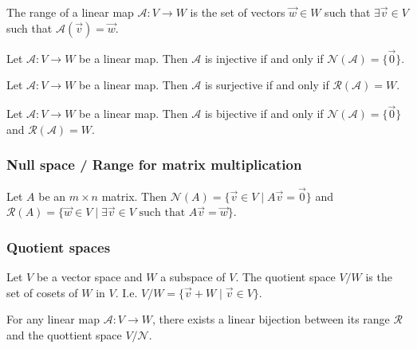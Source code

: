 \begin{definition}[Range]
    The range of a linear map $\mathcal{A}: V \to W$ is the set of vectors $\vec{w} \in W$ such that $\exists \vec{v} \in V$ such that $\mathcal{A}(\vec{v}) = \vec{w}$.
\end{definition}

\begin{theorem}
    Let $\mathcal{A}: V \to W$ be a linear map. Then $\mathcal{A}$ is injective if and only if $\mathcal{N}(\mathcal{A}) = \{\vec{0}\}$.
\end{theorem}

\begin{theorem}
    Let $\mathcal{A}: V \to W$ be a linear map. Then $\mathcal{A}$ is surjective if and only if $\mathcal{R}(\mathcal{A}) = W$.
\end{theorem}

\begin{theorem}
    Let $\mathcal{A}: V \to W$ be a linear map. Then $\mathcal{A}$ is bijective if and only if $\mathcal{N}(\mathcal{A}) = \{\vec{0}\}$ and $\mathcal{R}(\mathcal{A}) = W$.
\end{theorem}

\subsubsection{Null space / Range for matrix multiplication}
\begin{theorem}
    Let $A$ be an $m \times n$ matrix. Then $\mathcal{N}(A) = \{\vec{v} \in V \mid A\vec{v} = \vec{0}\}$ and $\mathcal{R}(A) = \{\vec{w} \in V \mid \exists \vec{v} \in V \text{ such that } A\vec{v} = \vec{w}\}$.
\end{theorem}

\subsubsection{Quotient spaces}
\begin{definition}
    Let $V$ be a vector space and $W$ a subspace of $V$. The quotient space $V/W$ is the set of cosets of $W$ in $V$.
    I.e. $V/W = \{\vec{v} + W \mid \vec{v} \in V\}$.
\end{definition}

\begin{theorem}
    For any linear map $\mathcal{A}: V \to W$, there exists a linear bijection between its range $\mathcal{R}$ and the quottient space $V/\mathcal{N}$.
\end{theorem}

